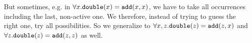 But sometimes, e.g. in $\forall x.\mathtt{double}(x) = \mathtt{add}(x,x)$, we have to take all occurrences including the last, non-active one. We therefore, instead of trying to guess the right one, try all possibilities. So we generalize to $\forall x,z.\mathtt{double}(z) = \mathtt{add}(z,x)$ and $\forall z.\mathtt{double}(z) = \mathtt{add}(z,z)$ as well.